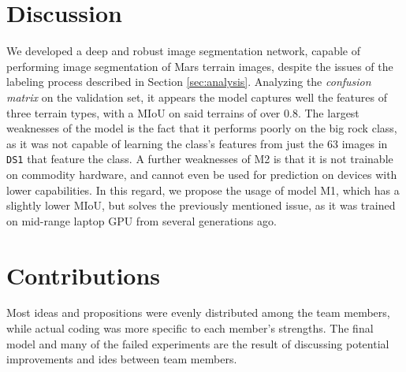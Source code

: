 \documentclass[11pt]{article}
\begin{document}
\begin{multicols}{2}
      \section{Discussion}

      We developed a deep and robust image segmentation network, capable of performing image segmentation of Mars terrain images, despite the issues of the labeling process described in Section \ref{sec:analysis}. Analyzing the \textit{confusion matrix} on the validation set, it appears the model captures well the features of three terrain types, with a MIoU on said terrains of over $0.8$. The largest weaknesses of the model is the fact that it performs poorly on the big rock class, as it was not capable of learning the class's features from just the $63$ images in \texttt{DS1} that feature the class. A further weaknesses of M2 is that it is not trainable on commodity hardware, and cannot even be used for prediction on devices with lower capabilities. In this regard, we propose the usage of model M1, which has a slightly lower MIoU, but solves the previously mentioned issue, as it was trained on mid-range laptop GPU from several generations ago.

      \section{Contributions}

      Most ideas and propositions were evenly distributed among the team members, while actual coding was more specific to each member's strengths. The final model and many of the failed experiments are the result of discussing potential improvements and ides between team members.


\end{multicols}
\end{document}
